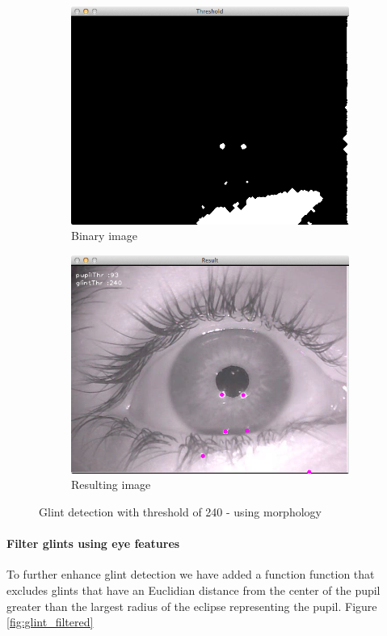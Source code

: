 \documentclass[a4paper,11pt]{article}
\begin{document}
\begin{figure}[H]
\centering
\begin{subfigure}{.48\textwidth}
  \centering
  \includegraphics[width=.8\linewidth]{glint_bin_morph}
  \caption{Binary image}
  \label{fig:glint_binary_morph}
\end{subfigure}
\begin{subfigure}{.48\textwidth}
  \centering
  \includegraphics[width=.8\linewidth]{glint_result_morph}
  \caption{Resulting image}
  \label{fig:glint_result_morph_morph}
\end{subfigure}
\caption{Glint detection with threshold of 240 - using morphology}
\label{fig:glint_morph}
\end{figure}

\paragraph{Filter glints using eye features} To further enhance glint detection we have added a function function that excludes glints that have an Euclidian distance from the center of the pupil greater than the largest radius of the eclipse representing the pupil. Figure \ref{fig:glint_filtered}
\end{document}
